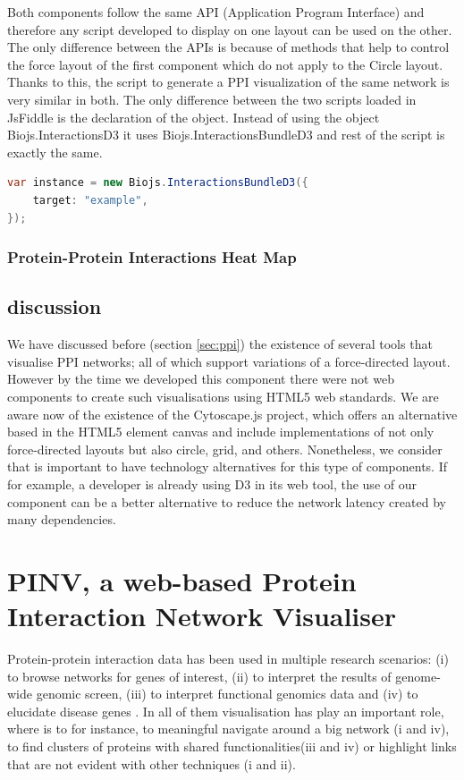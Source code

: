 Both components follow the same API (Application Program Interface) and therefore any script developed to display on one layout can be used on the other. The only difference between the APIs is because of methods that help to control the force layout of the first component which do not apply to the Circle layout. Thanks to this, the script to generate a PPI visualization of the same network is very similar in both.  The only difference between the two scripts loaded in JsFiddle is the declaration of the object. Instead of using the object Biojs.InteractionsD3 it uses Biojs.InteractionsBundleD3 and rest of the script is exactly the same.
\begin{lstlisting}[language=java]
var instance = new Biojs.InteractionsBundleD3({
    target: "example",
});
\end{lstlisting}





\subsubsection{Protein-Protein Interactions Heat Map} \label{subsubsec:ppi3_biojs}

\subsection{discussion}
We have discussed before (section \ref{sec:ppi}) the existence of several tools that visualise PPI networks; all of which support variations of a force-directed layout. However by the time we developed this component there were not web components to create such visualisations using HTML5 web standards. We are aware now of the existence of the Cytoscape.js project, which offers an alternative based in the HTML5 element canvas and include implementations of not only force-directed layouts but also circle, grid, and others. Nonetheless, we consider that is important to have technology alternatives  for this type of components. If for example, a developer is already using D3 in its web tool, the use of our component can be a better alternative to reduce the network latency created by many dependencies.

\section{PINV, a web-based Protein Interaction Network Visualiser }  \label{section:pinv}
Protein-protein interaction data has been used in multiple research scenarios: (i) to browse networks for genes of interest, (ii) to interpret the results of genome-wide genomic screen, (iii) to interpret functional genomics data and (iv) to elucidate disease genes \cite{FRA2013}. In all of them visualisation has play an important role, where is to for instance,  to meaningful navigate around a big network (i and iv), to find clusters of proteins with shared functionalities(iii and iv)  or highlight links that are not evident with other techniques (i and ii).

